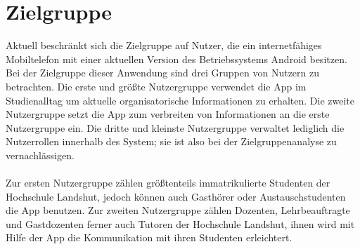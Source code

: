 \section{Zielgruppe}
Aktuell beschränkt sich die Zielgruppe auf Nutzer, die ein internetfähiges Mobiltelefon mit einer aktuellen Version des Betriebssystems Android besitzen.
Bei der Zielgruppe dieser Anwendung sind drei Gruppen von Nutzern zu betrachten.
Die erste und größte Nutzergruppe verwendet die App im Studienalltag um aktuelle organisatorische Informationen zu erhalten.
Die zweite Nutzergruppe setzt die App zum verbreiten von Informationen an die erste Nutzergruppe ein. 
Die dritte und kleinste Nutzergruppe verwaltet lediglich die Nutzerrollen innerhalb des System; sie ist also bei der Zielgruppenanalyse zu vernachlässigen.
\\
\\
Zur ersten Nutzergruppe zählen größtenteils immatrikulierte Studenten der Hochschule Landshut, jedoch können auch Gasthörer oder Austauschstudenten die App benutzen.
Zur zweiten Nutzergruppe zählen Dozenten, Lehrbeauftragte und Gastdozenten ferner auch Tutoren der Hochschule Landshut, ihnen wird mit Hilfe der App die Kommunikation mit ihren Studenten erleichtert.
